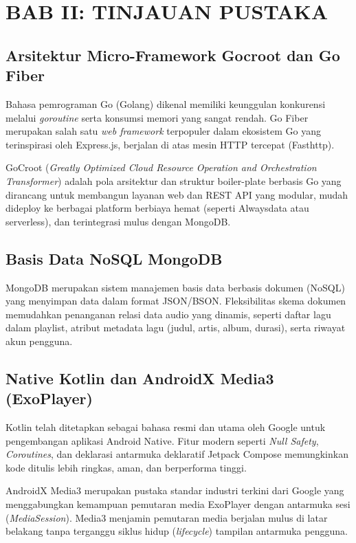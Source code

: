\section{BAB II: TINJAUAN PUSTAKA}

\subsection{Arsitektur Micro-Framework Gocroot dan Go Fiber}
Bahasa pemrograman Go (Golang) dikenal memiliki keunggulan konkurensi melalui \textit{goroutine} serta konsumsi memori yang sangat rendah. Go Fiber merupakan salah satu \textit{web framework} terpopuler dalam ekosistem Go yang terinspirasi oleh Express.js, berjalan di atas mesin HTTP tercepat (Fasthttp). 

GoCroot (\textit{Greatly Optimized Cloud Resource Operation and Orchestration Transformer}) adalah pola arsitektur dan struktur boiler-plate berbasis Go yang dirancang untuk membangun layanan web dan REST API yang modular, mudah dideploy ke berbagai platform berbiaya hemat (seperti Alwaysdata atau serverless), dan terintegrasi mulus dengan MongoDB.

\subsection{Basis Data NoSQL MongoDB}
MongoDB merupakan sistem manajemen basis data berbasis dokumen (NoSQL) yang menyimpan data dalam format JSON/BSON. Fleksibilitas skema dokumen memudahkan penanganan relasi data audio yang dinamis, seperti daftar lagu dalam playlist, atribut metadata lagu (judul, artis, album, durasi), serta riwayat akun pengguna.

\subsection{Native Kotlin dan AndroidX Media3 (ExoPlayer)}
Kotlin telah ditetapkan sebagai bahasa resmi dan utama oleh Google untuk pengembangan aplikasi Android Native. Fitur modern seperti \textit{Null Safety}, \textit{Coroutines}, dan deklarasi antarmuka deklaratif Jetpack Compose memungkinkan kode ditulis lebih ringkas, aman, dan berperforma tinggi.

AndroidX Media3 merupakan pustaka standar industri terkini dari Google yang menggabungkan kemampuan pemutaran media ExoPlayer dengan antarmuka sesi (\textit{MediaSession}). Media3 menjamin pemutaran media berjalan mulus di latar belakang tanpa terganggu siklus hidup (\textit{lifecycle}) tampilan antarmuka pengguna.

